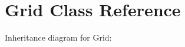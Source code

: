 \hypertarget{classGrid}{}\section{Grid Class Reference}
\label{classGrid}


Inheritance diagram for Grid\+:
